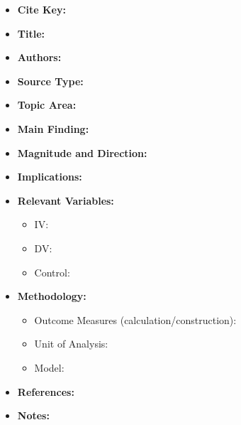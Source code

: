 %

\textbf{\citet{citekeyYYYYx}}
\begin{itemize}
	\item \textbf{Cite Key:} 
	\item \textbf{Title​:}
	\item \textbf{Authors​:}
	\item \textbf{Source Type​:}
	\item \textbf{Topic Area​:}
	\item \textbf{Main Finding​:}
	\item \textbf{Magnitude and Direction​:} 
	\item \textbf{Implications​:} 
	\item \textbf{Relevant Variables​:}
	\begin{itemize}
		\item IV: 
		\item DV: 
		\item Control: 
	\end{itemize}
		\item \textbf{Methodology​:}
	\begin{itemize}
		\item Outcome Measures (calculation/construction): 
		\item Unit of Analysis: 
		\item Model: 
	\end{itemize}
	\item \textbf{References:}
	\item \textbf{Notes:}
\end{itemize}

%